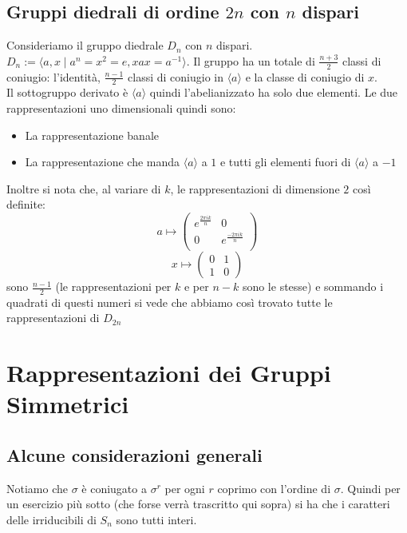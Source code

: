\documentclass[a4paper,NoNotes,GeneralMath]{stdmdoc}
\newcommand{\gen}[1]{\langle #1 \rangle}
\begin{document}
	\subsection{Gruppi diedrali di ordine $2n$ con $n$ dispari}
	Consideriamo il gruppo diedrale $D_{n}$ con $n$ dispari. $D_{n} := \langle a, x \mid a^n = x^2 = e, xax = a^{-1} \rangle$. Il gruppo ha un totale di $\frac{n+3}{2}$ classi di coniugio: l'identità, $\frac{n-1}{2}$ classi di coniugio in $\gen{a}$ e la classe di coniugio di $x$. \\
	Il sottogruppo derivato è $\gen{a}$ quindi l'abelianizzato ha solo due elementi. Le due rappresentazioni uno dimensionali quindi sono:
	\begin{itemize}
		\item La rappresentazione banale
		\item La rappresentazione che manda $\gen{a}$ a $1$ e tutti gli elementi fuori di $\gen{a}$ a $-1$
	\end{itemize}
	Inoltre si nota che, al variare di $k$, le rappresentazioni di dimensione $2$ così definite: $$a \mapsto \left( \begin{array}{cc} e^{ \frac{2\pi ik}{n} } & 0 \\ 0 & e^{ \frac{-2\pi ik}{n} } \\ \end{array} \right) $$ $$x \mapsto \left( \begin{array}{cc} 0 & 1 \\ 1 & 0 \end{array} \right)$$ sono $\frac{n-1}{2}$ (le rappresentazioni per $k$ e per $n-k$ sono le stesse) e sommando i quadrati di questi numeri si vede che abbiamo così trovato tutte le rappresentazioni di $D_{2n}$

	\section{Rappresentazioni dei Gruppi Simmetrici}
	\subsection{Alcune considerazioni generali}
	Notiamo che $\sigma$ è coniugato a $\sigma^r$ per ogni $r$ coprimo con l'ordine di $\sigma$. Quindi per un esercizio più sotto (che forse verrà trascritto qui sopra) si ha che i caratteri delle irriducibili di $S_n$ sono tutti interi.
	
\end{document}
